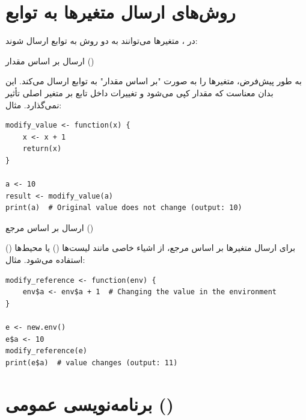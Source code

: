 \documentclass[11pt, a4paper, oneside]{book}
\newcounter{itemadded}
\let\LaTeXStandardEnumerateBegin\enumerate
\let\LaTeXStandardEnumerateEnd\endenumerate
\renewenvironment{enumerate}{%
	\LaTeXStandardEnumerateBegin%
	\setcounter{itemadded}{0}
}{%
	\LaTeXStandardEnumerateEnd%
}%
\begin{document}
		\section{روش‌های ارسال متغیرها به توابع}
		
			در ، متغیرها می‌توانند به دو روش به توابع ارسال شوند:
			
			\begin{enumerate}
				
				\item {\large ارسال بر اساس مقدار ()} \par
				
					به طور پیش‌فرض، متغیرها را به صورت "بر اساس مقدار" به توابع ارسال می‌کند. این بدان معناست که مقدار کپی می‌شود و تغییرات داخل تابع بر متغیر اصلی تأثیر نمی‌گذارد.
					مثال:
					\begin{latin}
						\begin{lstlisting}[caption={\lr{Pass by Value}}] 
modify_value <- function(x) {
	x <- x + 1
	return(x)
}

a <- 10
result <- modify_value(a)
print(a)  # Original value does not change (output: 10)

						\end{lstlisting}
					\end{latin}
				
				\item {\large ارسال بر اساس مرجع ()} \par
				
				برای ارسال متغیرها بر اساس مرجع، از اشیاء خاصی مانند لیست‌ها () یا محیط‌ها () استفاده می‌شود.
				مثال:
				
					\begin{latin}
						\begin{lstlisting}[caption={\lr{Pass by Reference}}] 
modify_reference <- function(env) {
	env$a <- env$a + 1  # Changing the value in the environment
}

e <- new.env()
e$a <- 10
modify_reference(e)
print(e$a)  # value changes (output: 11)

						\end{lstlisting}
					\end{latin}
				
			\end{enumerate}
		
		\section{برنامه‌نویسی عمومی ()}
		
\end{document}
